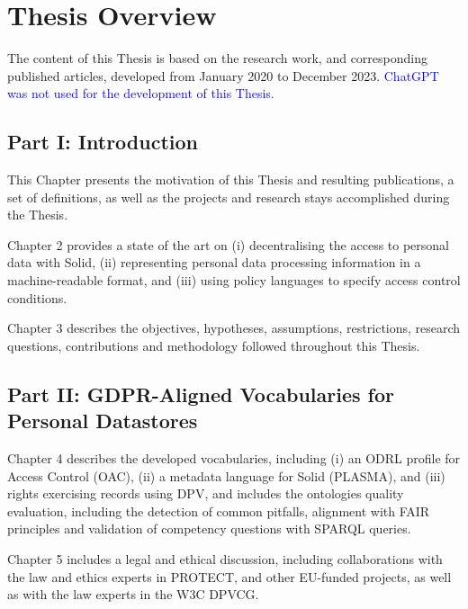 \section{Thesis Overview}
\label{sec:thesis_overview}

The content of this Thesis is based on the research work, and corresponding published articles, developed from January 2020 to December 2023.
\textcolor{blue}{ChatGPT was not used for the development of this Thesis.}

\subsection*{Part I: Introduction}

This Chapter presents the motivation of this Thesis and resulting publications, a set of definitions, as well as the projects and research stays accomplished during the Thesis.

Chapter 2 provides a state of the art on (i) decentralising the access to personal data with Solid, (ii) representing personal data processing information in a machine-readable format, and (iii) using policy languages to specify access control conditions.

Chapter 3 describes the objectives, hypotheses, assumptions, restrictions, research questions, contributions and methodology followed throughout this Thesis.

\subsection*{Part II: GDPR-Aligned Vocabularies for Personal Datastores}

Chapter 4 describes the developed vocabularies, including (i) an ODRL profile for Access Control (OAC), (ii) a metadata language for Solid (PLASMA), and (iii) rights exercising records using DPV, and includes the ontologies quality evaluation, including the detection of common pitfalls, alignment with FAIR principles and validation of competency questions with SPARQL queries.

Chapter 5 includes a legal and ethical discussion, including collaborations with the law and ethics experts in PROTECT, and other EU-funded projects, as well as with the law experts in the W3C DPVCG.

